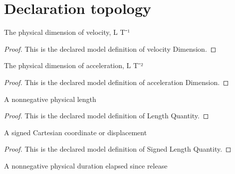 \section{Declaration topology}
\begin{definition}
  \label{def:physics:phyx-mini-0738:phyxminiproblems-problemphyxmini0738-velocitydimension}
  The physical dimension of velocity, L T⁻¹
\end{definition}
\begin{proof}
  This is the declared model definition of velocity Dimension.
\end{proof}
\begin{definition}
  \label{def:physics:phyx-mini-0738:phyxminiproblems-problemphyxmini0738-accelerationdimension}
  The physical dimension of acceleration, L T⁻²
\end{definition}
\begin{proof}
  This is the declared model definition of acceleration Dimension.
\end{proof}
\begin{definition}
  \label{def:physics:phyx-mini-0738:phyxminiproblems-problemphyxmini0738-lengthquantity}
  A nonnegative physical length
\end{definition}
\begin{proof}
  This is the declared model definition of Length Quantity.
\end{proof}
\begin{definition}
  \label{def:physics:phyx-mini-0738:phyxminiproblems-problemphyxmini0738-signedlengthquantity}
  A signed Cartesian coordinate or displacement
\end{definition}
\begin{proof}
  This is the declared model definition of Signed Length Quantity.
\end{proof}
\begin{definition}
  \label{def:physics:phyx-mini-0738:phyxminiproblems-problemphyxmini0738-durationquantity}
  A nonnegative physical duration elapsed since release
\end{definition}
